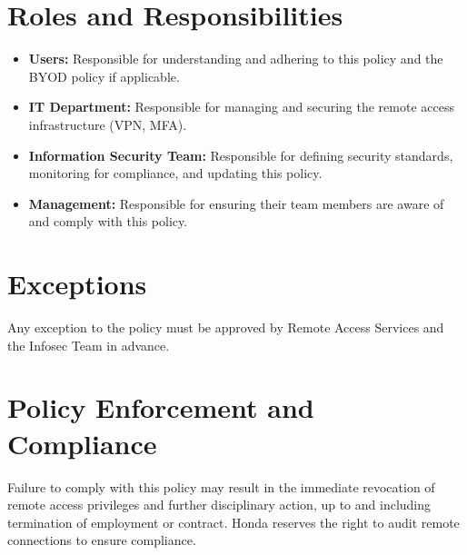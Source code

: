 \section{Roles and Responsibilities}
\begin{itemize}
    \item \textbf{Users:} Responsible for understanding and adhering to this policy and the BYOD policy if applicable.
    \item \textbf{IT Department:} Responsible for managing and securing the remote access infrastructure (VPN, MFA).
    \item \textbf{Information Security Team:} Responsible for defining security standards, monitoring for compliance, and updating this policy.
    \item \textbf{Management:} Responsible for ensuring their team members are aware of and comply with this policy.
\end{itemize}

\section{Exceptions}
Any exception to the policy must be approved by Remote Access Services and the Infosec Team in advance.

\section{Policy Enforcement and Compliance}
Failure to comply with this policy may result in the immediate revocation of remote access privileges and further disciplinary action, up to and including termination of employment or contract. Honda reserves the right to audit remote connections to ensure compliance.

